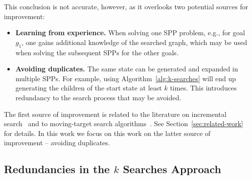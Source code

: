 \documentclass{aicom2e}
\begin{document}
This conclusion is not accurate, however, as it overlooks two potential sources for improvement:
\begin{itemize}
	\item {\bf Learning from experience.} When solving one SPP problem, e.g., for goal $g_1$, one gains additional knowledge of the searched graph, which may be used when solving the subsequent SPPs for the other goals.
	\item {\bf Avoiding duplicates.} The same state can be generated and expanded in multiple SPPs. For example, using Algorithm~\ref{alg:k-searches} will end up generating the children of the start state at least $k$ times. This introduces redundancy to the search process that may be avoided.  
\end{itemize}
The first source of improvement is related to the literature on incremental search~\cite{koenig2004lifelong} and to moving-target search algorithms~\cite{ishida1995moving,koenig2007speeding}. See Section~\ref{sec:related-work} for details. In this work we focus on this work on the latter source of improvement -- avoiding duplicates. %

\subsection{Redundancies in the $k$ Searches Approach}
\end{document}
